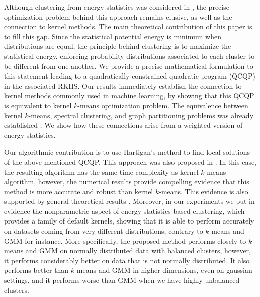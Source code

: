 \documentclass[aps,preprint,nofootinbib,floatfix]{revtex4-1}
\begin{document}
Although clustering from energy statistics was considered
in \cite{Kgroups}, the precise optimization problem behind this approach
remains elusive, as well as the connection to kernel methods.
The main theoretical contribution of this paper is to fill this gap.
Since the statistical potential energy is minimum when
distributions are equal, the
principle behind clustering is to maximize the statistical energy, 
enforcing probability distributions associated to each cluster
to be different from one another.
We provide a precise mathematical formulation to this
statement
leading to
a quadratically constrained
quadratic program (QCQP) in the associated RKHS. Our results immediately 
establish the connection 
to kernel methods commonly used in machine learning, 
by showing that this QCQP is equivalent
to kernel $k$-means optimization problem. 
The equivalence between kernel $k$-means, 
spectral clustering, and graph partitioning problems was already established
\cite{Dhillon,Dhillon2}. We show how these connections arise
from a weighted version of energy statistics.

Our algorithmic contribution is to use Hartigan's method
\cite{Hartigan} to find local 
solutions of the above mentioned QCQP.
This approach was also proposed in \cite{Kgroups}.
In this case,
the resulting algorithm has the same
time complexity as kernel $k$-means algorithm, however, the numerical 
results provide compelling evidence that this method
is more accurate and robust than kernel $k$-means. This evidence
is also supported by general theoretical results \cite{Telgarsky,Slonin}.
Moreover, in our experiments we put in
evidence the nonparametric aspect of energy
statistics based clustering, which provides a family of 
default kernels, showing that
it is able to perform accurately on datasets coming from very different 
distributions, contrary to $k$-means and GMM for instance.
More specifically, the proposed method performs closely to $k$-means
and GMM on normally distributed data with balanced clusters, however, it
performs considerably better on  data that is not normally distributed. 
It also
performs better than $k$-means and GMM in higher dimensions, even on 
gaussian settings, and it performs worse than 
GMM when we have highly unbalanced clusters.
\end{document}

